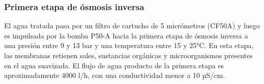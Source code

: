 \subsubsection{Primera etapa de ósmosis inversa}

El agua tratada pasa por un filtro de cartucho de 5 micrómetros (CF50A) y luego es impulsada por la bomba P50-A hacia la primera etapa de ósmosis inversa a una presión entre 9 y 13 bar y una temperatura entre 15 y 25°C. En esta etapa, las membranas retienen sales, sustancias orgánicas y microorganismos presentes en el agua suavizada. El flujo de agua producto de la primera etapa es aproximadamente 4000 l/h, con una conductividad menor a 10 µS/cm.